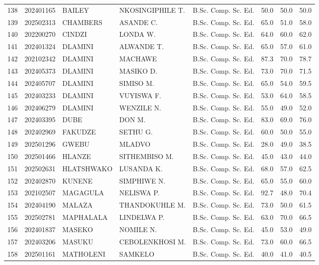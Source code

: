 \documentclass[12pt]{article}
\begin{document}
\begin{longtable}{@{}llllllll@{}}
138 & 202401165 & BAILEY & NKOSINGIPHILE T. & B.Sc. Comp. Sc. Ed. & 50.0 & 50.0 & 50.0 \\
139 & 202502313 & CHAMBERS & ASANDE C. & B.Sc. Comp. Sc. Ed. & 65.0 & 51.0 & 58.0 \\
140 & 202200270 & CINDZI & LONDA W. & B.Sc. Comp. Sc. Ed. & 64.0 & 60.0 & 62.0 \\
141 & 202401324 & DLAMINI & ALWANDE T. & B.Sc. Comp. Sc. Ed. & 65.0 & 57.0 & 61.0 \\
142 & 202102342 & DLAMINI & MACHAWE & B.Sc. Comp. Sc. Ed. & 87.3 & 70.0 & 78.7 \\
143 & 202405373 & DLAMINI & MASIKO D. & B.Sc. Comp. Sc. Ed. & 73.0 & 70.0 & 71.5 \\
144 & 202405707 & DLAMINI & SIMISO M. & B.Sc. Comp. Sc. Ed. & 65.0 & 54.0 & 59.5 \\
145 & 202403233 & DLAMINI & VUYISWA F. & B.Sc. Comp. Sc. Ed. & 53.0 & 64.0 & 58.5 \\
146 & 202406279 & DLAMINI & WENZILE N. & B.Sc. Comp. Sc. Ed. & 55.0 & 49.0 & 52.0 \\
147 & 202403395 & DUBE & DON M. & B.Sc. Comp. Sc. Ed. & 83.0 & 69.0 & 76.0 \\
148 & 202402969 & FAKUDZE & SETHU G. & B.Sc. Comp. Sc. Ed. & 60.0 & 50.0 & 55.0 \\
149 & 202501296 & GWEBU & MLADVO & B.Sc. Comp. Sc. Ed. & 28.0 & 49.0 & 38.5 \\
150 & 202501466 & HLANZE & SITHEMBISO M. & B.Sc. Comp. Sc. Ed. & 45.0 & 43.0 & 44.0 \\
151 & 202502631 & HLATSHWAKO & LUSANDA K. & B.Sc. Comp. Sc. Ed. & 68.0 & 57.0 & 62.5 \\
152 & 202402870 & KUNENE & SIMPHIWE N. & B.Sc. Comp. Sc. Ed. & 65.0 & 55.0 & 60.0 \\
153 & 202102507 & MAGAGULA & NELISWA P. & B.Sc. Comp. Sc. Ed. & 92.7 & 48.0 & 70.4 \\
154 & 202404190 & MALAZA & THANDOKUHLE M. & B.Sc. Comp. Sc. Ed. & 73.0 & 50.0 & 61.5 \\
155 & 202502781 & MAPHALALA & LINDELWA P. & B.Sc. Comp. Sc. Ed. & 63.0 & 70.0 & 66.5 \\
156 & 202401837 & MASEKO & NOMILE N. & B.Sc. Comp. Sc. Ed. & 45.0 & 53.0 & 49.0 \\
157 & 202403206 & MASUKU & CEBOLENKHOSI M. & B.Sc. Comp. Sc. Ed. & 73.0 & 60.0 & 66.5 \\
158 & 202501161 & MATHOLENI & SAMKELO & B.Sc. Comp. Sc. Ed. & 40.0 & 41.0 & 40.5 \\

\end{longtable}
\end{document}
